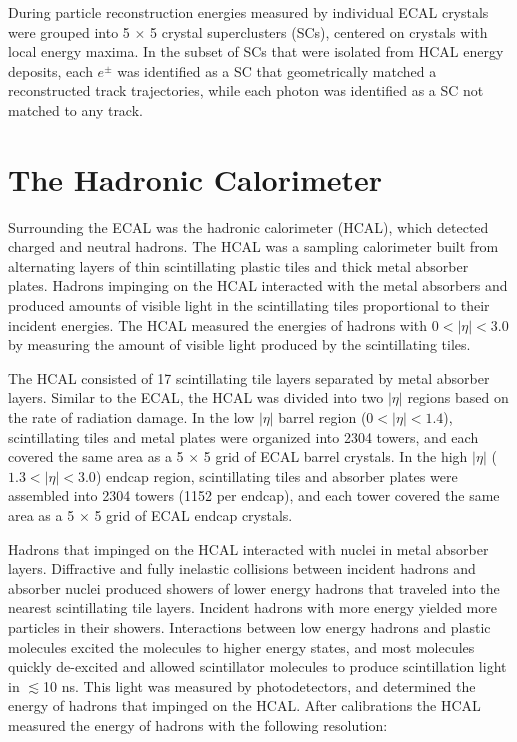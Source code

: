 During particle reconstruction energies measured by individual ECAL crystals were grouped into 5 $\times$ 5 crystal superclusters 
(SCs), centered on crystals with local energy maxima.  In the subset of SCs that were isolated 
from HCAL energy deposits, each $e^{\pm}$ was identified as a SC that geometrically matched a reconstructed track 
trajectories, while each photon was identified as a SC not matched to any track.


\section{The Hadronic Calorimeter}
\label{sec:hcalDescription}
Surrounding the ECAL was the hadronic calorimeter (HCAL), which detected charged and neutral hadrons.  The 
HCAL was a sampling calorimeter built from alternating layers of thin scintillating plastic tiles and thick 
metal absorber plates.  Hadrons impinging on the HCAL interacted with the metal absorbers and produced amounts 
of visible light in the scintillating tiles proportional to their incident energies.  The HCAL 
measured the energies of hadrons with $0 < |\eta| < 3.0$ by measuring the amount of visible light produced 
by the scintillating tiles.

The HCAL consisted of 17 scintillating tile layers separated by metal absorber layers.  Similar to the ECAL, the 
HCAL was divided into two $|\eta|$ regions based on the rate of radiation damage.  In the low $|\eta|$ barrel 
region ($0 < |\eta| < 1.4$), scintillating tiles and metal plates were organized into 2304 towers, and each 
covered the same area as a 5 $\times$ 5 grid of 
ECAL barrel crystals.  In the high $|\eta|$ ($1.3 < |\eta| < 3.0$) endcap region, scintillating 
tiles and absorber plates were assembled into 2304 towers (1152 per endcap), and each tower covered the same area 
as a 5 $\times$ 5 grid of ECAL endcap crystals.

Hadrons that impinged on the HCAL interacted with nuclei in metal absorber layers.  Diffractive and fully 
inelastic collisions between incident hadrons and absorber nuclei produced showers of lower 
energy hadrons that traveled into the nearest scintillating tile layers.  Incident hadrons with more energy yielded 
more particles in their showers.  Interactions between low energy hadrons and plastic molecules excited the molecules to 
higher energy states, and most molecules quickly de-excited and allowed scintillator molecules to produce scintillation 
light in $\lesssim$10 ns.  This light was measured by photodetectors, and determined the energy of hadrons 
that impinged on the HCAL.  After calibrations the HCAL measured the energy of hadrons with the following resolution:

